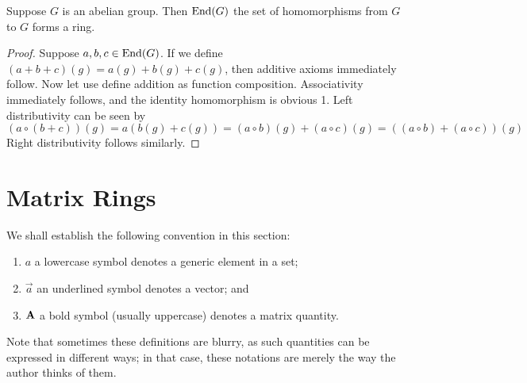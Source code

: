 \begin{proposition}
    Suppose \(G\) is an abelian group.
    Then \(\operatorname{End}(G)\) the set of homomorphisms from \(G\) to \(G\)
    forms a ring.
\end{proposition}
\begin{proof}
    Suppose \(a,b,c \in \operatorname{End}(G)\).
    If we define \((a+b+c)(g) = a(g)+b(g)+c(g)\),
    then additive axioms immediately follow.
    Now let use define addition as function composition.
    Associativity immediately follows,
    and the identity homomorphism is obvious 1.
    Left distributivity can be seen by
    \begin{equation*}
        (a\circ(b+c))(g) = a(b(g)+c(g))
        = (a \circ b)(g) + (a \circ c)(g)
        = ((a \circ b) + (a \circ c))(g)
    \end{equation*}
    Right distributivity follows similarly.
\end{proof}


\section{Matrix Rings}\label{sec:matrix-rings}

\begin{remark}
    We shall establish the following convention in this section:
    \begin{enumerate}[label={(\roman*)}, itemsep=0mm]
        \item \(a\) a lowercase symbol denotes a generic element in a set;
        \item \(\vec{a}\) an underlined symbol denotes a vector; and
        \item \(\vb{A}\) a bold symbol (usually uppercase)
            denotes a matrix quantity.
    \end{enumerate}
    Note that sometimes these definitions are blurry,
    as such quantities can be expressed in different ways;
    in that case, these notations are merely the way the author thinks of them.
\end{remark}



